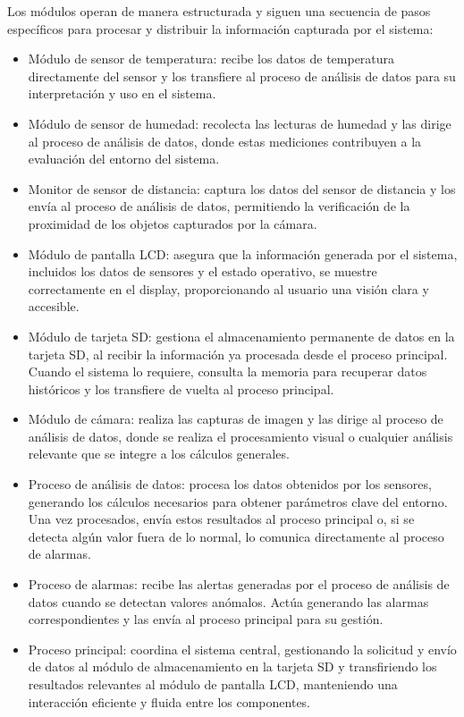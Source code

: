 Los módulos operan de manera estructurada y siguen una secuencia de pasos específicos para procesar y distribuir la información capturada por el sistema:

\begin{itemize}
\item Módulo de sensor de temperatura: recibe los datos de temperatura directamente del sensor y los transfiere al proceso de análisis de datos para su interpretación y uso en el sistema.
\item Módulo de sensor de humedad: recolecta las lecturas de humedad y las dirige al proceso de análisis de datos, donde estas mediciones contribuyen a la evaluación del entorno del sistema.
\item Monitor de sensor de distancia: captura los datos del sensor de distancia y los envía al proceso de análisis de datos, permitiendo la verificación de la proximidad de los objetos capturados por la cámara.
\item Módulo de pantalla LCD: asegura que la información generada por el sistema, incluidos los datos de sensores y el estado operativo, se muestre correctamente en el display, proporcionando al usuario una visión clara y accesible.

\newpage

\item Módulo de tarjeta SD: gestiona el almacenamiento permanente de datos en la tarjeta SD, al recibir la información ya procesada desde el proceso principal. Cuando el sistema lo requiere, consulta la memoria para recuperar datos históricos y los transfiere de vuelta al proceso principal.
\item Módulo de cámara: realiza las capturas de imagen y las dirige al proceso de análisis de datos, donde se realiza el procesamiento visual o cualquier análisis relevante que se integre a los cálculos generales.
\item Proceso de análisis de datos: procesa los datos obtenidos por los sensores, generando los cálculos necesarios para obtener parámetros clave del entorno. Una vez procesados, envía estos resultados al proceso principal o, si se detecta algún valor fuera de lo normal, lo comunica directamente al proceso de alarmas.
\item Proceso de alarmas: recibe las alertas generadas por el proceso de análisis de datos cuando se detectan valores anómalos. Actúa generando las alarmas correspondientes y las envía al proceso principal para su gestión.
\item Proceso principal: coordina el sistema central, gestionando la solicitud y envío de datos al módulo de almacenamiento en la tarjeta SD y transfiriendo los resultados relevantes al módulo de pantalla LCD, manteniendo una interacción eficiente y fluida entre los componentes.
\end{itemize}

